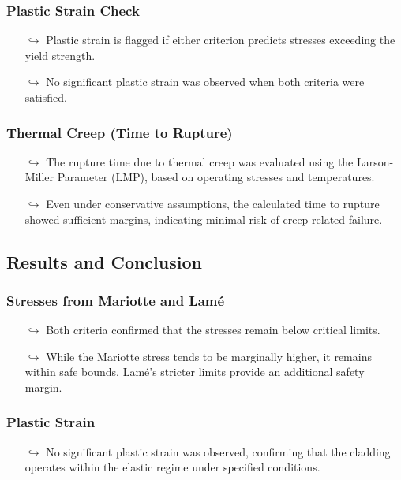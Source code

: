 \subsubsection{Plastic Strain Check}
\begin{itemize}
    \item[$\hookrightarrow$] Plastic strain is flagged if either criterion predicts stresses exceeding the yield strength.
    \item[$\hookrightarrow$] No significant plastic strain was observed when both criteria were satisfied.
\end{itemize}

\subsubsection{Thermal Creep (Time to Rupture)}
\begin{itemize}
    \item[$\hookrightarrow$] The rupture time due to thermal creep was evaluated using the Larson-Miller Parameter (LMP), based on operating stresses and temperatures.
    \item[$\hookrightarrow$] Even under conservative assumptions, the calculated time to rupture showed sufficient margins, indicating minimal risk of creep-related failure.
\end{itemize}

\subsection{Results and Conclusion}

\subsubsection{Stresses from Mariotte and Lamé}
\begin{itemize}
    \item[$\hookrightarrow$] Both criteria confirmed that the stresses remain below critical limits.
    \item[$\hookrightarrow$] While the Mariotte stress tends to be marginally higher, it remains within safe bounds. Lamé's stricter limits provide an additional safety margin.
\end{itemize}

\subsubsection{Plastic Strain}
\begin{itemize}
    \item[$\hookrightarrow$] No significant plastic strain was observed, confirming that the cladding operates within the elastic regime under specified conditions.
\end{itemize}

